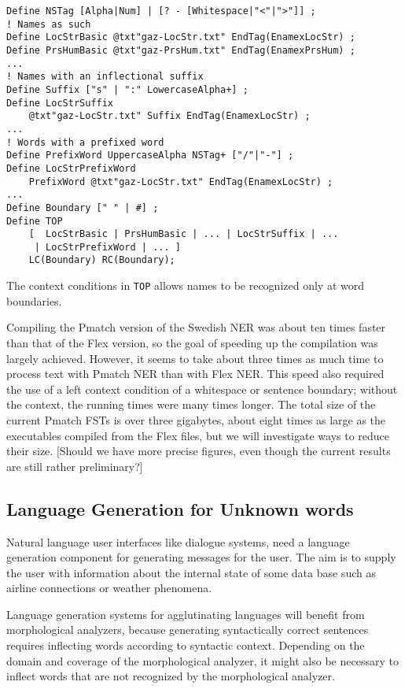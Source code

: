 \documentclass{llncs}
\begin{document}
\begin{verbatim}
Define NSTag [Alpha|Num] | [? - [Whitespace|"<"|">"]] ;
! Names as such
Define LocStrBasic @txt"gaz-LocStr.txt" EndTag(EnamexLocStr) ;
Define PrsHumBasic @txt"gaz-PrsHum.txt" EndTag(EnamexPrsHum) ;
...
! Names with an inflectional suffix
Define Suffix ["s" | ":" LowercaseAlpha+] ;
Define LocStrSuffix
    @txt"gaz-LocStr.txt" Suffix EndTag(EnamexLocStr) ;
...
! Words with a prefixed word
Define PrefixWord UppercaseAlpha NSTag+ ["/"|"-"] ;
Define LocStrPrefixWord 
    PrefixWord @txt"gaz-LocStr.txt" EndTag(EnamexLocStr) ;
...
Define Boundary [" " | #] ;
Define TOP
    [  LocStrBasic | PrsHumBasic | ... | LocStrSuffix | ... 
     | LocStrPrefixWord | ... ]
    LC(Boundary) RC(Boundary);
\end{verbatim}

The context conditions in \texttt{TOP} allows names to be recognized
only at word boundaries.

Compiling the Pmatch version of the Swedish NER was about ten times
faster than that of the Flex version, so the goal of speeding up the
compilation was largely achieved. However, it seems to take about
three times as much time to process text with Pmatch NER than with
Flex NER. This speed also required the use of a left context condition
of a whitespace or sentence boundary; without the context, the running
times were many times longer. The total size of the current Pmatch
FSTs is over three gigabytes, about eight times as large as the
executables compiled from the Flex files, but we will investigate ways
to reduce their size. \textsf{[Should we have more precise figures,
  even though the current results are still rather preliminary?]}

\subsection{Language Generation for Unknown words}
\label{sec:morph-generation}
Natural language user interfaces like dialogue systems, need a
language generation component for generating messages for the
user. The aim is to supply the user with information about the
internal state of some data base such as airline connections or
weather phenomena.

Language generation systems for agglutinating languages will benefit
from morphological analyzers, because generating syntactically correct
sentences requires inflecting words according to syntactic
context. Depending on the domain and coverage of the morphological
analyzer, it might also be necessary to inflect words that are not
recognized by the morphological analyzer. 
\end{document}

